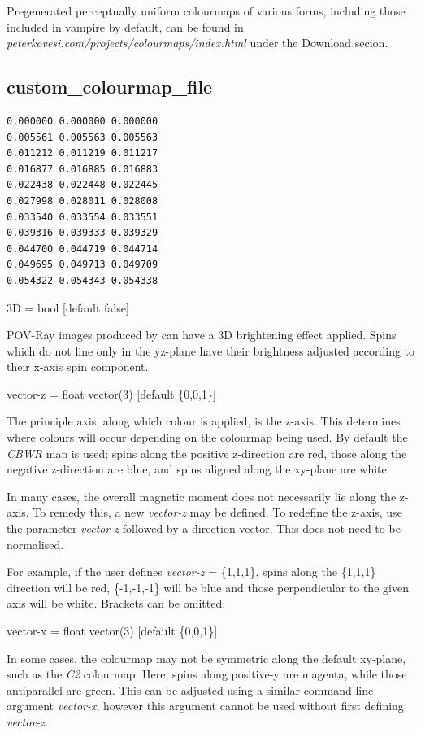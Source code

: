 Pregenerated perceptually uniform colourmaps of various forms, including those
included in vampire by default, can be found in
\textit{peterkovesi.com/projects/\newline colourmaps/index.html} under the
Download secion.

\subsection*{custom\_colourmap\_file}
{\footnotesize
\begin{verbatim}
0.000000 0.000000 0.000000
0.005561 0.005563 0.005563
0.011212 0.011219 0.011217
0.016877 0.016885 0.016883
0.022438 0.022448 0.022445
0.027998 0.028011 0.028008
0.033540 0.033554 0.033551
0.039316 0.039333 0.039329
0.044700 0.044719 0.044714
0.049695 0.049713 0.049709
0.054322 0.054343 0.054338
\end{verbatim}
}

{\zicf 3D = bool [default false]}
 POV-Ray images produced by
\vdc can have a 3D brightening effect applied. Spins which do not line only in
the yz-plane have their brightness adjusted according to their x-axis spin
component.

{\zicf vector-z = float vector(3) [default \{0,0,1\}]}
 The principle axis,
along which colour is applied, is the z-axis. This determines where colours will
occur depending on the colourmap being used. By default the \textit{CBWR} map is
used; spins along the positive z-direction are red, those along the negative
z-direction are blue, and spins aligned along the xy-plane are white.

In many cases, the overall magnetic moment does not necessarily lie along the
z-axis. To remedy this, a new \textit{vector-z} may be defined. To redefine the
z-axis, use the parameter \textit{vector-z} followed by a direction vector. This
does not need to be normalised.

For example, if the user defines \textit{vector-z} = \{1,1,1\}, spins along the
\{1,1,1\} direction will be red, \{-1,-1,-1\} will be blue and those
perpendicular to the given axis will be white. Brackets can be omitted.

{\zicf vector-x = float vector(3) [default \{0,0,1\}]}
 In some cases, the
colourmap may not be symmetric along the default xy-plane, such as the
\textit{C2} colourmap. Here, spins along positive-y are magenta, while those
antiparallel are green. This can be adjusted using a similar command line
argument \textit{vector-x}, however this argument cannot be used without first
defining \textit{vector-z}.


